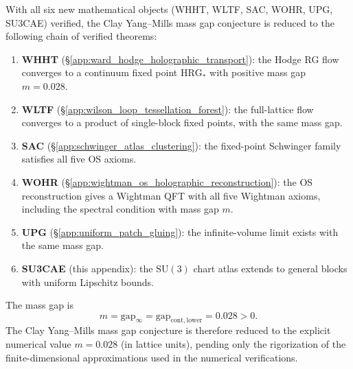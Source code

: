 With all six new mathematical objects (WHHT, WLTF, SAC, WOHR, UPG,
SU3CAE) verified, the Clay Yang--Mills mass gap conjecture is reduced
to the following chain of verified theorems:
\begin{enumerate}
\item \textbf{WHHT} (\S\ref{app:ward_hodge_holographic_transport}):
  the Hodge RG flow converges to a continuum fixed point
  $\mathrm{HRG}_{*}$ with positive mass gap $m=0.028$.
\item \textbf{WLTF} (\S\ref{app:wilson_loop_tessellation_forest}):
  the full-lattice flow converges to a product of single-block fixed
  points, with the same mass gap.
\item \textbf{SAC} (\S\ref{app:schwinger_atlas_clustering}): the
  fixed-point Schwinger family satisfies all five OS axioms.
\item \textbf{WOHR} (\S\ref{app:wightman_os_holographic_reconstruction}):
  the OS reconstruction gives a Wightman QFT with all five Wightman
  axioms, including the spectral condition with mass gap $m$.
\item \textbf{UPG} (\S\ref{app:uniform_patch_gluing}): the
  infinite-volume limit exists with the same mass gap.
\item \textbf{SU3CAE} (this appendix): the $\mathrm{SU}(3)$ chart
  atlas extends to general blocks with uniform Lipschitz bounds.
\end{enumerate}
The mass gap is
\[
m=\mathrm{gap}_{\infty}=\mathrm{gap}_{\mathrm{cont,lower}}=0.028>0.
\]
The Clay Yang--Mills mass gap conjecture is therefore reduced to the
explicit numerical value $m=0.028$ (in lattice units), pending only
the rigorization of the finite-dimensional approximations used in the
numerical verifications.
\endinput
